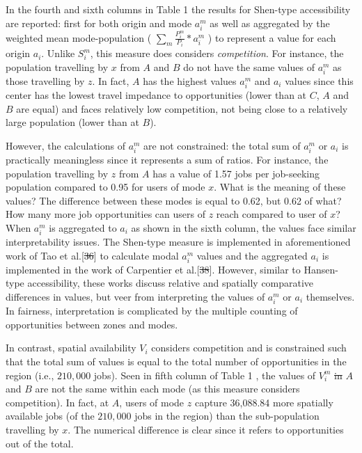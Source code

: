 \documentclass[10pt,letterpaper]{article}
\providecommand{\DIFaddtex}[1]{{\protect\color{blue}\uwave{#1}}} %
\providecommand{\DIFdeltex}[1]{{\protect\color{red}\sout{#1}}}                      %
\providecommand{\DIFaddbegin}{} %
\providecommand{\DIFaddend}{} %
\providecommand{\DIFdelbegin}{} %
\providecommand{\DIFdelend}{} %
\providecommand{\DIFadd}[1]{\texorpdfstring{\DIFaddtex{#1}}{#1}} %
\providecommand{\DIFdel}[1]{\texorpdfstring{\DIFdeltex{#1}}{}} %
\newcommand{\DIFscaledelfig}{0.5}
\newlength{\DIFdelgraphicswidth} %
\newlength{\DIFdelgraphicsheight} %
\newcommand{\DIFaddincludegraphics}[2][]{{\color{blue}\fbox{\DIFOincludegraphics[#1]{#2}}}} %
\newcommand{\DIFdelincludegraphics}[2][]{%
\sbox{\DIFdelgraphicsbox}{\DIFOincludegraphics[#1]{#2}}%
\settoboxwidth{\DIFdelgraphicswidth}{\DIFdelgraphicsbox} %
\settoboxtotalheight{\DIFdelgraphicsheight}{\DIFdelgraphicsbox} %
\scalebox{\DIFscaledelfig}{%
\parbox[b]{\DIFdelgraphicswidth}{\usebox{\DIFdelgraphicsbox}\\[-\baselineskip] \rule{\DIFdelgraphicswidth}{0em}}\llap{\resizebox{\DIFdelgraphicswidth}{\DIFdelgraphicsheight}{%
\setlength{\unitlength}{\DIFdelgraphicswidth}%
\begin{picture}(1,1)%
\thicklines\linethickness{2pt} %
{\color[rgb]{1,0,0}\put(0,0){\framebox(1,1){}}}%
{\color[rgb]{1,0,0}\put(0,0){\line( 1,1){1}}}%
{\color[rgb]{1,0,0}\put(0,1){\line(1,-1){1}}}%
\end{picture}%
}\hspace*{3pt}}} %
} %
\DeclareRobustCommand{\DIFaddbegin}{\DIFOaddbegin \let\includegraphics\DIFaddincludegraphics} %
\DeclareRobustCommand{\DIFaddend}{\DIFOaddend \let\includegraphics\DIFOincludegraphics} %
\DeclareRobustCommand{\DIFdelbegin}{\DIFOdelbegin \let\includegraphics\DIFdelincludegraphics} %
\DeclareRobustCommand{\DIFdelend}{\DIFOaddend \let\includegraphics\DIFOincludegraphics} %
\begin{document}
In the fourth and sixth columns in Table 1 the results for Shen-type
accessibility are reported: first for both origin and mode \(a_i^m\) as
well as aggregated by the weighted mean mode-population (
\(\sum_m \frac{P_i^m}{P_i}*a_i^m\) ) to represent a value for each
origin \(a_i\). Unlike \(S_i^m\), this measure does considers
\emph{competition}. For instance, the population travelling by \(x\)
from \(A\) and \(B\) do not have the same values of \(a_i^m\) as those
travelling by \(z\). In fact, \(A\) has the highest values \(a_i^m\) and
\(a_i\) values since this center has the lowest travel impedance to
opportunities (lower than at \(C\), \(A\) and \(B\) are equal) and faces
relatively low competition, not being close to a relatively large
population (lower than at \(B\)).

However, the calculations of \(a_i^m\) are not constrained: the total
sum of \(a_i^m\) or \(a_i\) is practically meaningless since it
represents a sum of ratios. For instance, the population travelling by
\(z\) from \(A\) has a value of 1.57 jobs per job-seeking population
compared to 0.95 for users of mode \(x\). What is the meaning of these
values? The difference between these modes is equal to 0.62, but 0.62 of
what? How many more job opportunities can users of \(z\) reach compared
to user of \(x\)? When \(a_i^m\) is aggregated to \(a_i\) as shown in
the sixth column, the values face similar interpretability issues. The
Shen-type measure is implemented in aforementioned work of Tao et
al.\DIFaddbegin \DIFadd{~(2020) }\DIFaddend {[}\DIFdelbegin \DIFdel{36}\DIFdelend \DIFaddbegin \DIFadd{48}\DIFaddend {]} to calculate modal \(a_i^m\) values and the
aggregated \(a_i\) is implemented in the work of Carpentier et
al.\DIFaddbegin \DIFadd{~(2020) }\DIFaddend {[}\DIFdelbegin \DIFdel{38}\DIFdelend \DIFaddbegin \DIFadd{50}\DIFaddend {]}. However, similar to Hansen-type accessibility,
these works discuss relative and spatially comparative differences in
values, but veer from interpreting the values of \(a_i^m\) or \(a_i\)
themselves. In fairness, interpretation is complicated by the multiple
counting of opportunities between zones and modes.

In contrast, spatial availability \(V_i\) considers competition and is
constrained such that the total sum of values is equal to the total
number of opportunities in the region (i.e., \(210,000\) jobs). Seen in
fifth column of Table 1 , the values of \(V_i^m\) \DIFdelbegin \DIFdel{in }\DIFdelend \DIFaddbegin \DIFadd{for }\DIFaddend \(A\) and \(B\)
are not the same within each mode (as this measure considers
competition). In fact, at \(A\), users of mode \(z\) capture 36,088.84
more spatially available jobs (of the \(210,000\) jobs in the region)
than the sub-population travelling by \DIFaddbegin \DIFadd{the slower-mode }\DIFaddend \(x\). The
numerical difference is clear since it refers to opportunities out of
the total.
\end{document}
